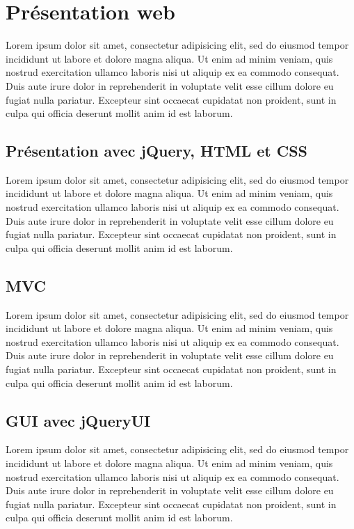 \documentclass{article}
\begin{document}

\section{Présentation web} %
\label{sec:presentation_web}
Lorem ipsum dolor sit amet, consectetur adipisicing elit, sed do eiusmod tempor incididunt ut labore et dolore magna aliqua. Ut enim ad minim veniam, quis nostrud exercitation ullamco laboris nisi ut aliquip ex ea commodo consequat. Duis aute irure dolor in reprehenderit in voluptate velit esse cillum dolore eu fugiat nulla pariatur. Excepteur sint occaecat cupidatat non proident, sunt in culpa qui officia deserunt mollit anim id est laborum.

\subsection{Présentation avec jQuery, HTML et CSS} %
\label{sub:presentation_avec_jquery_html_et_css}
Lorem ipsum dolor sit amet, consectetur adipisicing elit, sed do eiusmod tempor incididunt ut labore et dolore magna aliqua. Ut enim ad minim veniam, quis nostrud exercitation ullamco laboris nisi ut aliquip ex ea commodo consequat. Duis aute irure dolor in reprehenderit in voluptate velit esse cillum dolore eu fugiat nulla pariatur. Excepteur sint occaecat cupidatat non proident, sunt in culpa qui officia deserunt mollit anim id est laborum.

\subsection{MVC} %
\label{sub:mvc}
Lorem ipsum dolor sit amet, consectetur adipisicing elit, sed do eiusmod tempor incididunt ut labore et dolore magna aliqua. Ut enim ad minim veniam, quis nostrud exercitation ullamco laboris nisi ut aliquip ex ea commodo consequat. Duis aute irure dolor in reprehenderit in voluptate velit esse cillum dolore eu fugiat nulla pariatur. Excepteur sint occaecat cupidatat non proident, sunt in culpa qui officia deserunt mollit anim id est laborum.

\subsection{GUI avec jQueryUI} %
\label{sub:gui_avec_jqueryui}
Lorem ipsum dolor sit amet, consectetur adipisicing elit, sed do eiusmod tempor incididunt ut labore et dolore magna aliqua. Ut enim ad minim veniam, quis nostrud exercitation ullamco laboris nisi ut aliquip ex ea commodo consequat. Duis aute irure dolor in reprehenderit in voluptate velit esse cillum dolore eu fugiat nulla pariatur. Excepteur sint occaecat cupidatat non proident, sunt in culpa qui officia deserunt mollit anim id est laborum.
\end{document}
